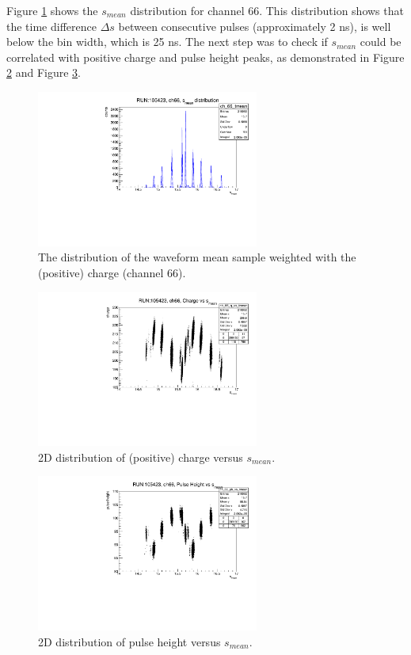 Figure \ref{fig:smean} shows the $s_{mean}$ distribution 
for channel 66. 
This distribution shows that the time difference $\Delta s$ 
between consecutive pulses (approximately 2 ns), is well below the 
bin width, which is 25 ns. 
The next step was to check if $s_{mean}$ could be 
correlated with positive charge and pulse height peaks, 
as demonstrated in Figure \ref{fig:chtm} and Figure \ref{fig:phtm}.
\begin{figure}[!h]
  \centering
  \includegraphics[width=0.65\textwidth]{figures/pdf/tmean1.pdf}
  \caption[The distribution of the waveform $s_{mean}$.]{The distribution of the waveform mean sample weighted with the (positive) charge (channel 66).}
  \label{fig:smean}
\end{figure}
\begin{figure}[!h]
  \centering
  \includegraphics[width=0.65\textwidth]{figures/pdf/chtmean.pdf}
  \caption[2D distribution of (positive) charge versus $s_{mean}$.]{2D distribution of (positive) charge versus $s_{mean}$.}
  \label{fig:chtm}
\end{figure}
\begin{figure}[!h]
  \centering
  \includegraphics[width=0.65\textwidth]{figures/pdf/phtmean1.pdf}
  \caption[2D distribution of pulse height versus $s_{mean}$.]{2D distribution of pulse height versus $s_{mean}$.}
  \label{fig:phtm}
\end{figure}
